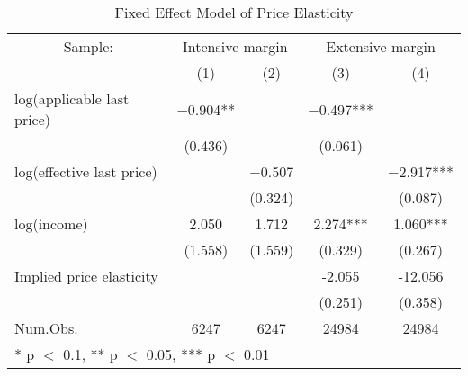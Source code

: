 \begin{table}

\caption{Fixed Effect Model of Price Elasticity \label{tab:fe-model}}
\centering
\begin{tabular}[t]{lcccc}
\toprule
\multicolumn{1}{c}{Sample:} & \multicolumn{2}{c}{Intensive-margin} & \multicolumn{2}{c}{Extensive-margin} \\
\cmidrule(l{3pt}r{3pt}){1-1} \cmidrule(l{3pt}r{3pt}){2-3} \cmidrule(l{3pt}r{3pt}){4-5}
  & (1) & (2) & (3) & (4)\\
\midrule
log(applicable last price) & \num{-0.904}** &  & \num{-0.497}*** & \\
 & (\num{0.436}) &  & (\num{0.061}) & \\
log(effective last price) &  & \num{-0.507} &  & \num{-2.917}***\\
 &  & (\num{0.324}) &  & (\num{0.087})\\
log(income) & \num{2.050} & \num{1.712} & \num{2.274}*** & \num{1.060}***\\
 & (\num{1.558}) & (\num{1.559}) & (\num{0.329}) & (\num{0.267})\\
\midrule
Implied price elasticity &  &  & -2.055 & -12.056\\
 &  &  & (0.251) & (0.358)\\
Num.Obs. & \num{6247} & \num{6247} & \num{24984} & \num{24984}\\
\bottomrule
\multicolumn{5}{l}{\rule{0pt}{1em}* p $<$ 0.1, ** p $<$ 0.05, *** p $<$ 0.01}\\
\end{tabular}
\end{table}
